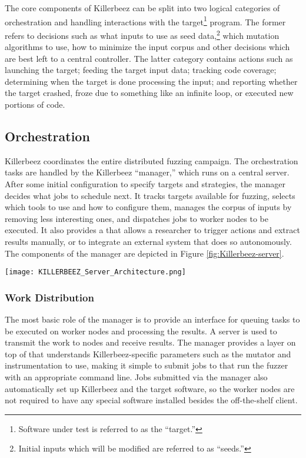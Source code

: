 The core components of Killerbeez can be split into two logical categories
of orchestration and handling interactions with the target\footnote{Software under test is referred to as the ``target.''}
program.  The former refers to decisions such as what
inputs to use as seed data,\footnote{Initial inputs which will be modified
are referred to as ``seeds.''} which mutation algorithms to use, how to minimize
the input corpus and other decisions which are best left to a central
controller.  The latter category contains actions such as launching the target;
feeding the target input data; tracking code coverage; determining when the target is
done processing the input; and reporting whether the target crashed, froze due
to something like an infinite loop, or executed new portions of code.

\subsection{Orchestration}
Killerbeez coordinates the entire distributed fuzzing
campaign. The orchestration tasks are handled by the Killerbeez ``manager,''
which runs on a central server. After some initial configuration to specify
targets and strategies, the manager decides what jobs to schedule next.
It tracks targets available for fuzzing, selects which tools to
use and how to configure them, manages the corpus of inputs by removing
less interesting ones, and dispatches jobs to worker nodes to be executed.  It also
provides a \REST{} \API{} that allows a researcher to trigger actions and
extract results manually, or to integrate an external system that
does so autonomously. The components of the manager are depicted in Figure
\ref{fig:Killerbeez-server}.

\begin{figure*}[!ht]
\centering
\texttt{[image: KILLERBEEZ\_Server\_Architecture.png]}
\caption{Killerbeez Server Architecture}
\label{fig:Killerbeez-server}
\end{figure*}

\subsubsection{Work Distribution}
The most basic role of the manager is to provide an interface for queuing tasks
to be executed on worker nodes and processing the results. A \BOINC{} server is
used to transmit the work to nodes and receive results. The manager provides a
layer on top of \BOINC{} that understands Killerbeez-specific parameters such as
the mutator and instrumentation to use, making it simple to submit jobs to
\BOINC{} that run the fuzzer with an appropriate command line. Jobs
submitted via the manager also automatically set up Killerbeez and the target
software, so the worker nodes are not required to have any special software
installed besides the off-the-shelf \BOINC{} client.

